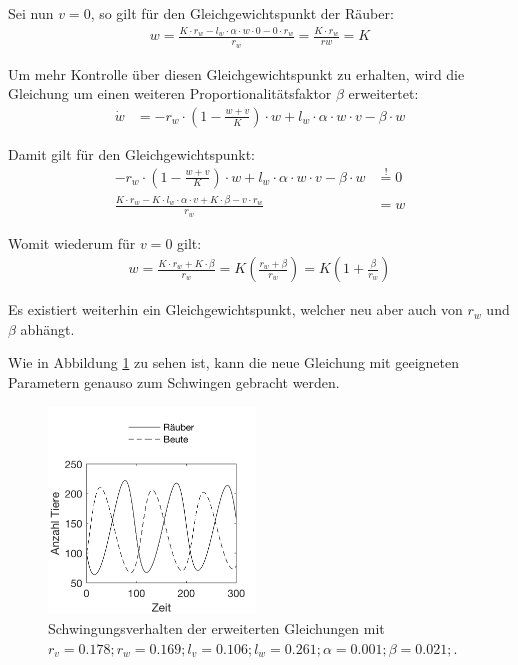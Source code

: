 \documentclass[a4paper,twoside]{article}
\begin{document}
	Sei nun \(v=0\), so gilt für den Gleichgewichtspunkt der Räuber:
	\begin{align*}
		w = \frac{K \cdot r_w - l_w \cdot \alpha \cdot w \cdot 0 - 0 \cdot r_w}{r_w} = \frac{K \cdot r_w}{rw} = K
	\end{align*}
	
	Um mehr Kontrolle über diesen Gleichgewichtspunkt zu erhalten, wird die Gleichung um einen weiteren Proportionalitätsfaktor \( \beta \) erweitertet:
	 \begin{align*}
		\dot{w} &= -r_w \cdot \left(1 - \frac{w+v}{K} \right) \cdot w + l_w \cdot \alpha \cdot w \cdot v - \beta \cdot w
	\end{align*}
	
	\noindent
	Damit gilt für den Gleichgewichtspunkt:
	\begin{align*}
		-r_w \cdot \left(1 - \frac{w+v}{K} \right) \cdot w + l_w \cdot \alpha \cdot w \cdot v - \beta \cdot w &\stackrel{!}{=} 0\\
		\frac{K \cdot r_w - K \cdot l_w \cdot \alpha \cdot v + K \cdot \beta - v \cdot r_w}{r_w} &= w
	\end{align*}
	
	\noindent
	Womit wiederum für \(v=0\) gilt:
	\begin{align*}
		w = \frac{K \cdot r_w + K \cdot \beta}{r_w} = K \left( \frac{r_w + \beta}{r_w} \right) = K \left( 1 + \frac{\beta}{r_w} \right)
	\end{align*}
	
	Es existiert weiterhin ein Gleichgewichtspunkt, welcher neu aber auch von \(r_w\) und \(\beta\) abhängt.
	
	Wie in Abbildung \ref{fig:beute_raeuber_oszillation_mit_b} zu sehen ist, kann die neue Gleichung mit geeigneten Parametern genauso zum Schwingen gebracht werden.
	
	\begin{figure}[!h]
  		\centering
 		\includegraphics[width=5.5cm]{Diagramme/beute_raeuber_oszillation_mit_b.png}
  		\caption{Schwingungsverhalten der erweiterten Gleichungen mit \(r_v=0.178; r_w=0.169; l_v=0.106; l_w=0.261; \alpha = 0.001; \beta = 0.021; \).}
  		\label{fig:beute_raeuber_oszillation_mit_b}
	\end{figure}
	
\end{document}
